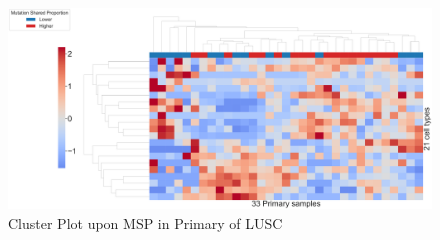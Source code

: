 \documentclass{beamer}
\begin{document}
\begin{frame}[allowframebreaks]
        \begin{figure}
            \includegraphics[width=0.9 \linewidth]{figures/BisqueRNA/clustermap/STAR.FPKM.GSE162498.SQC.MSP-median/Mutation Shared Proportion-Primary.pdf}
            \caption{Cluster Plot upon MSP in Primary of LUSC}
        \end{figure}
    \end{frame}
\end{document}
